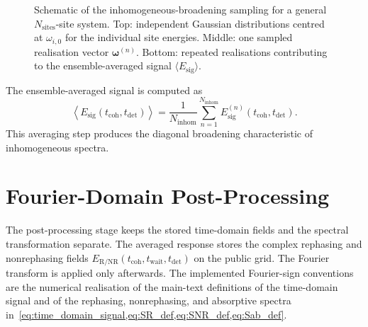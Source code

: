 \begin{figure}[htbp]
    \caption{Schematic of the inhomogeneous-broadening sampling for a general
    \(N_{\mathrm{sites}}\)-site system. Top: independent Gaussian distributions
    centred at \(\omega_{i,0}\) for the individual site energies. Middle: one
    sampled realisation vector \(\boldsymbol{\omega}^{(n)}\). Bottom: repeated
    realisations contributing to the ensemble-averaged signal
    \(\langle E_{\mathrm{sig}}\rangle\).}
    \label{fig:app_inhomogeneous_sampling_general}
\end{figure}

The ensemble-averaged signal is computed as
\begin{equation}
\label{eq:averaged_response}
\left\langle E_{\mathrm{sig}}(t_{\mathrm{coh}},t_{\mathrm{det}})\right\rangle
=
\frac{1}{N_{\mathrm{inhom}}}
\sum_{n=1}^{N_{\mathrm{inhom}}}
E_{\mathrm{sig}}^{(n)}(t_{\mathrm{coh}},t_{\mathrm{det}}).
\end{equation}
This averaging step produces the diagonal broadening characteristic of
inhomogeneous spectra.

\section{Fourier-Domain Post-Processing}
\label{app:sec:post_processing}

The post-processing stage keeps the stored time-domain fields and the spectral
transformation separate. The averaged response stores the complex rephasing and
nonrephasing fields
\(E_{\mathrm{R/NR}}(t_{\mathrm{coh}},t_{\mathrm{wait}},t_{\mathrm{det}})\)
on the public grid. The Fourier transform is applied only afterwards. The
implemented Fourier-sign conventions are the numerical realisation of the
main-text definitions of the time-domain signal and of the rephasing,
nonrephasing, and absorptive spectra
in~\cref{eq:time_domain_signal,eq:SR_def,eq:SNR_def,eq:Sab_def}.

